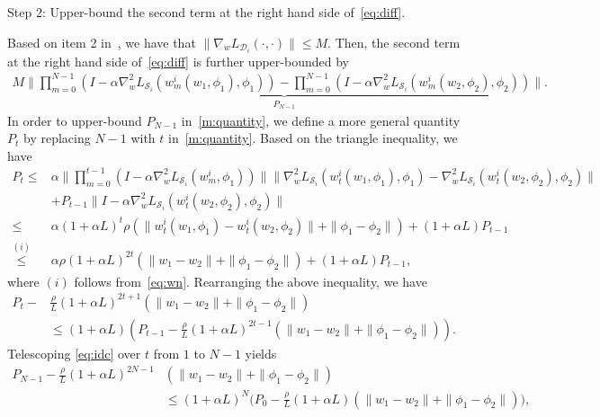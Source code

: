 \documentclass{osudissert96}
\begin{document}
{ Step 2: Upper-bound the second term at the right hand side of~\cref{eq:diff}.}

Based on item 2 in~, we have that $\|\nabla_{w} L_{\mathcal{D}_i}(\cdot,\cdot)\|\leq M$. Then, the second term at the right hand side of~\cref{eq:diff} is further upper-bounded by 
\begin{align}\label{m:quantity}
M\underbrace{\bigg\|\prod_{m=0}^{N-1}(I - \alpha \nabla_w^2L_{\mathcal{S}_i}(w_{m}^i(w_1,\phi_1),\phi_1)) -\prod_{m=0}^{N-1}(I - \alpha \nabla_w^2L_{\mathcal{S}_i}(w_{m}^i(w_2,\phi_2),\phi_2))\bigg\|}_{P_{N-1}}. 
\end{align}
In order to upper-bound $P_{N-1}$ in~\cref{m:quantity}, we define a more general quantity $P_t$ by replacing $N-1$ with $t$ in~\cref{m:quantity}. Based on the triangle inequality, we have 
\begin{align}
P_t \leq& \alpha \bigg\|\prod_{m=0}^{t-1}(I - \alpha \nabla_w^2L_{\mathcal{S}_i}(w_{m}^i,\phi_1))\bigg\|\Big\|  \nabla_w^2L_{\mathcal{S}_i}(w_{t}^i(w_1,\phi_1),\phi_1) - \nabla_w^2L_{\mathcal{S}_i}(w_{t}^i(w_2,\phi_2),\phi_2)\Big\| \nonumber
\\ &+ P_{t-1} \Big\|I - \alpha \nabla_w^2L_{\mathcal{S}_i}(w_{t}^i(w_2,\phi_2),\phi_2)\Big\| \nonumber
\\\leq & \alpha(1+\alpha L)^t \rho (\|w_{t}^i(w_1,\phi_1) -w_{t}^i(w_2,\phi_2)\| + \|\phi_1-\phi_2\|) + (1+\alpha L)P_{t-1}\nonumber
\\\overset{(i)}\leq &\alpha \rho(1+\alpha L)^{2t}  (\|w_1-w_2\|+\|\phi_1-\phi_2\|) + (1+\alpha L) P_{t-1}, \nonumber
\end{align} 
where $(i)$ follows from~\cref{eq:wn}.  Rearranging the above inequality, we have  
\begin{align}\label{eq:idc}
P_t - &\frac{\rho}{L}(1+\alpha L)^{2t+1}  (\|w_1-w_2\|+\|\phi_1-\phi_2\|)  \nonumber
\\&\leq (1+\alpha L)(P_{t-1}-\frac{\rho}{L}(1+\alpha L)^{2t-1}(\|w_1-w_2\|+\|\phi_1-\phi_2\|)).
\end{align}
Telescoping \cref{eq:idc} over $t$ from $1$ to $N-1$ yields
\begin{align}
P_{N-1} - \frac{\rho}{L}(1+\alpha L)^{2N-1}  &(\|w_1-w_2\|+\|\phi_1-\phi_2\|)   \nonumber
\\&\leq (1+\alpha L)^{N}\Big(P_{0}-\frac{\rho}{L}(1+\alpha L)(\|w_1-w_2\|+\|\phi_1-\phi_2\|) \Big),  \nonumber
\end{align}
\end{document}

